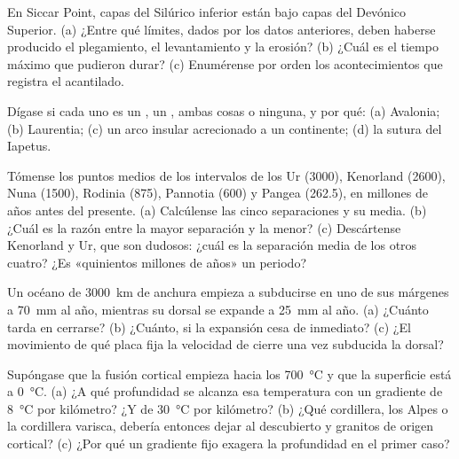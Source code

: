 \begin{exercise}[$\star$]\label{exo:b2:wilson-cycle:3}
En Siccar Point, capas del Silúrico inferior están bajo capas del Devónico Superior. (a) ¿Entre qué límites,
dados por los datos anteriores, deben haberse producido el plegamiento, el levantamiento y la erosión? (b) ¿Cuál es
el tiempo máximo que pudieron durar? (c) Enumérense por orden los acontecimientos que registra el acantilado.
\end{exercise}

\begin{exercise}[$\star$]\label{exo:b2:wilson-cycle:4}
Dígase si cada uno es un , un , ambas cosas o ninguna, y por qué: (a) Avalonia;
(b) Laurentia; (c) un arco insular acrecionado a un continente; (d) la sutura del Iapetus.
\end{exercise}

\begin{exercise}[$\star\star$]\label{exo:b2:wilson-cycle:5}
Tómense los puntos medios de los intervalos de los  Ur (3000), Kenorland (2600),
Nuna (1500), Rodinia (875), Pannotia (600) y Pangea (262.5), en millones de años antes del presente.
(a) Calcúlense las cinco separaciones y su media. (b) ¿Cuál es la razón entre la mayor separación y
la menor? (c) Descártense Kenorland y Ur, que son dudosos: ¿cuál es la separación media de los
otros cuatro? ¿Es «quinientos millones de años» un periodo?
\end{exercise}

\begin{exercise}[$\star\star$]\label{exo:b2:wilson-cycle:6}
Un océano de \qty{3000}{km} de anchura empieza a subducirse en uno de sus márgenes a \qty{70}{mm} al año,
mientras su dorsal se expande a \qty{25}{mm} al año. (a) ¿Cuánto tarda en cerrarse?
(b) ¿Cuánto, si la expansión cesa de inmediato? (c) ¿El movimiento de qué placa fija la velocidad de cierre una vez
subducida la dorsal?
\end{exercise}

\begin{exercise}[$\star\star$]\label{exo:b2:wilson-cycle:7}
Supóngase que la fusión cortical empieza hacia los \qty{700}{\celsius} y que la superficie está a
\qty{0}{\celsius}. (a) ¿A qué profundidad se alcanza esa temperatura con un gradiente de
\qty{8}{\celsius} por kilómetro? ¿Y de \qty{30}{\celsius} por kilómetro? (b) ¿Qué cordillera, los
Alpes o la cordillera varisca, debería entonces dejar al descubierto  y granitos de origen cortical?
(c) ¿Por qué un gradiente fijo exagera la profundidad en el primer caso?
\end{exercise}

